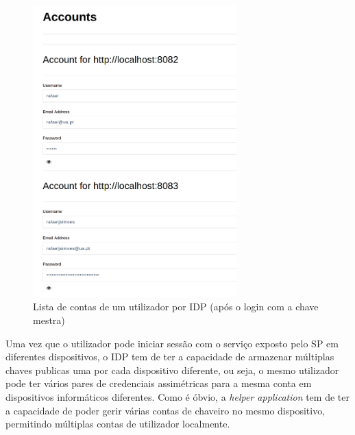 \begin{figure}[H]
    \caption{Lista de contas de um utilizador por IDP (após o login com a chave mestra)}
    \label{fig:accounts}
    \includegraphics[width=0.7\textwidth, height=0.7\textheight]{img/accounts.png}
    \centering
\end{figure}

\quad Uma vez que o utilizador pode iniciar sessão com o serviço exposto pelo SP em diferentes dispositivos, o IDP tem de ter a capacidade de armazenar múltiplas chaves publicas uma por cada dispositivo diferente, ou seja, o mesmo utilizador pode ter vários pares de credenciais assimétricas para a mesma conta em dispositivos informáticos diferentes. Como é óbvio, a \textit{helper application} tem de ter a capacidade de poder gerir várias contas de chaveiro no mesmo dispositivo, permitindo múltiplas contas de utilizador localmente.


